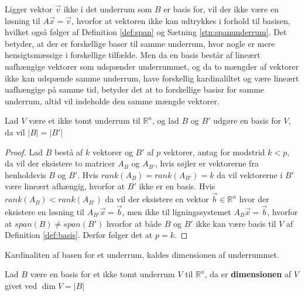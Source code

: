 Ligger vektor $\vec{v}$ ikke i det underrum som $B$ er basis for, vil der ikke være en løsning til $A \vec{x} =\vec{v}$, hvorfor at vektoren ikke kan udtrykkes i forhold til basisen, hvilket også følger af Definition \ref{def:span} og Sætning \ref{stn:spanunderrum}.
Det betyder, at der er forskellige baser til samme underrum, hvor nogle er mere hensigtsmæssige i forskellige tilfælde.
Men da en basis består af lineært uafhængige vektorer som udspænder underrummet, og da to mængder af vektorer ikke kan udspænde samme underrum, have forskellig kardinaliltet og være lineært uafhængige på samme tid, betyder det at to forskellige basisr for samme underrum, altid vil indeholde den samme mængde vektorer.
\begin{stn}
Lad $V$ være et ikke tomt underrum til $\mathds{R}^n$, og lad $B$ og $B'$ udgøre en basis for $V$, da vil $|B|=|B'|$
\label{stn:basiskardinalitet}
\end{stn}
\begin{proof}
Lad $B$ bestå af $k$ vektorer og $B'$ af $p$ vektorer, antag for modstrid $k < p$, da vil der eksistere to matricer $A_{B}$ og $A_{B'}$, hvis søjler er vektorerne fra henholdsvis $B$ og $B'$.
Hvis $rank(A_{B}) = rank(A_{B'}) = k$ da vil vektorerne i $B'$ være lineært afhængig, hvorfor at $B'$ ikke er en basis.
Hvis $rank(A_{B}) < rank(A_{B'} )$ da vil der eksistere en vektor $\vec{b} \in \mathds{R}^n$ hvor der eksistere en løsning til $A_{B'}\vec{x} = \vec{b}$, men ikke til ligningssystemet $A_B \vec{x}=\vec{b}$, hvorfor at $span(B) \neq span(B')$ hvorfor at både $B$ og $B'$ ikke kan være basis til $V$ af Definition \ref{def:basis}.
Derfor følger det at $p=k$.
\end{proof}
Kardinaliten af basen for et underrum, kaldes dimensionen af underrummet.
\begin{defn}[Dimension]
Lad $B$ være en basis for et ikke tomt underrum $V$ til $\mathds{R}^n$, da er \textbf{dimensionen} af $V$ givet ved $\dim{V} = |B|$
\label{def:dim}
\end{defn}



